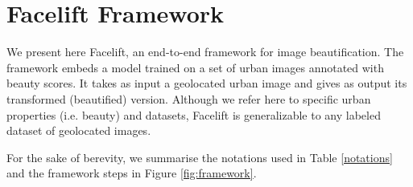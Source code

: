 \section{Facelift Framework}
\label{sec:framework}

We present here Facelift, an end-to-end  framework for
 image beautification. The framework embeds a model trained on a set of urban images annotated with beauty scores. It takes as input a geolocated urban image and gives as output its transformed (beautified) version. %
 Although we refer here to specific urban properties (i.e. beauty) and datasets, Facelift is generalizable to any labeled dataset of geolocated images. %

For the sake of berevity, we summarise the notations used in Table \ref{notations} and the framework steps in Figure \ref{fig:framework}. 


